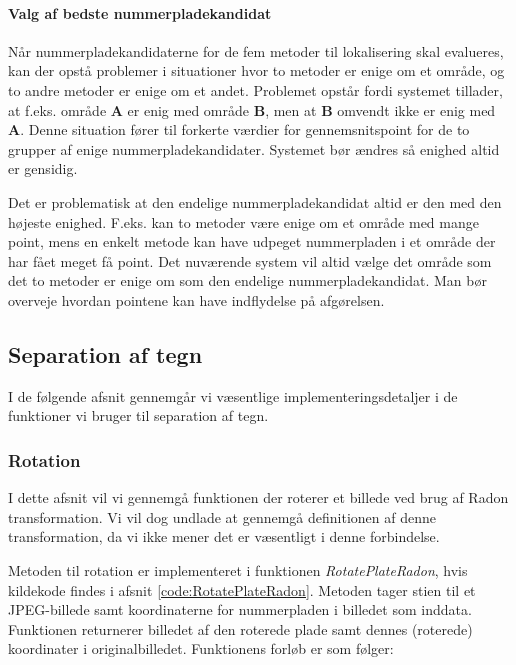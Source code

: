 \paragraph{Valg af bedste nummerpladekandidat}
Når nummerpladekandidaterne for de fem metoder til lokalisering skal evalueres, kan der opstå  problemer i situationer hvor to metoder er enige om et område, og to andre metoder er enige om et andet. Problemet opstår fordi systemet tillader, at f.eks. område \textbf{A} er enig med område \textbf{B}, men at \textbf{B} omvendt ikke er enig med \textbf{A}. Denne situation fører til forkerte værdier for gennemsnitspoint for de to grupper af enige nummerpladekandidater. Systemet bør ændres så 
enighed altid er gensidig.

Det er problematisk at den endelige nummerpladekandidat altid er den med den højeste enighed. F.eks. kan to metoder være enige om et område med mange point, mens en enkelt metode kan have udpeget nummerpladen i et område der har fået meget få point. Det nuværende system vil altid vælge det område som det to metoder er enige om som den endelige nummerpladekandidat. Man bør overveje hvordan pointene kan have indflydelse på afgørelsen.   



\subsection{Separation af tegn}

I de følgende afsnit gennemgår vi væsentlige implementeringsdetaljer i de funktioner vi bruger til separation af tegn.

\subsubsection{Rotation}
\label{sec:implementation/sep/rotation}

I dette afsnit vil vi gennemgå funktionen der roterer et billede ved brug af Radon transformation. Vi vil dog undlade at gennemgå definitionen af denne transformation, da vi ikke mener det er væsentligt i denne forbindelse.

Metoden til rotation er implementeret i funktionen \textit{RotatePlateRadon}, hvis kildekode findes i afsnit \vref{code:RotatePlateRadon}. Metoden tager stien til et JPEG-billede samt koordinaterne for nummerpladen i billedet som inddata. Funktionen returnerer billedet af den roterede plade samt dennes (roterede) koordinater i originalbilledet. Funktionens forløb er som følger:

